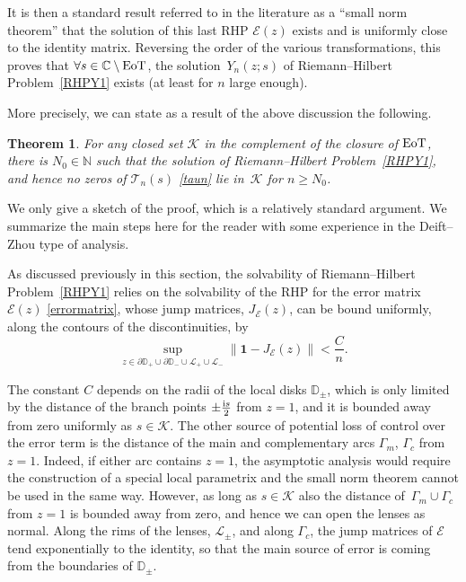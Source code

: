 \documentclass[10pt,a4paper]{amsart}
\numberwithin{equation}{section}
\newtheorem{Theorem}{Theorem}[section]
\theoremstyle{definition}
\def \scr{\mathscr}
\def \DD{\mathbb D}
\def\le{\left}
\def\ri{\right}
\def\be{\begin{equation}}
\def\ee{\end{equation}}
\def \1{\mathbf 1}
\def\C{{\mathbb C}}
\def\N{{\mathbb N}}
\def\pa{\partial}
\def\la{\label}
\begin{document}
It is then a standard result referred to in the literature as a ``small norm theorem'' \cite{Deiftbook,DKMVZ} that the solution of this last RHP $\scr E(z)$ exists and is uniformly close to the identity matrix.
Reversing the order of the various transformations, this proves that $\forall s\in \C \setminus {\rm EoT}$, the solution~$Y_n(z;s)$ of Riemann--Hilbert Problem~\ref{RHPY1} exists (at least for $n$ large enough).

More precisely, we can state as a result of the above discussion the following.


\begin{Theorem}\la{theoremnozeros}
For any closed set $\mathcal K$ in the complement of the closure of ${\rm EoT}$, there is $N_0\in \N$ such that the solution of Riemann--Hilbert Problem~{\rm\ref{RHPY1}}, and hence no zeros of $\mathcal T_n(s)$ \eqref{taun} lie in~$\mathcal K$ for $n\geq N_0$.
\end{Theorem}

We only give a sketch of the proof, which is a relatively standard argument. We summarize the main steps here for the reader with some experience in the Deift--Zhou type of analysis.

 As discussed previously in this section, the solvability of Riemann--Hilbert Problem~\ref{RHPY1} relies on the solvability of the RHP for the error matrix $\scr E(z)$ \eqref{errormatrix}, whose jump matrices, $J_{\scr E}(z)$, can be bound uniformly, along the contours of the discontinuities, by
\be
\sup_{z\in \pa\DD_+\cup \pa \DD_- \cup \scr L_+\cup \scr L_-}
\le\|\1 - J_{\scr E}(z)\ri\| < \frac C n.
\label{estim}
\ee

The constant $C$ depends on the radii of the local disks $\DD_\pm$, which is only limited by the distance of the branch points $\pm \frac {{\rm i} s}2$ from $z=1$, and it is bounded away from zero uniformly as $s\in \mathcal K$. The other source of potential loss of control over the error term is the distance of the main and complementary arcs $\Gamma_m$, $\Gamma_c$ from $z=1$. Indeed, if either arc contains $z=1$, the asymptotic analysis would require the construction of a special local parametrix and the small norm theorem cannot be used in the same way. However, as long as $s\in \mathcal K$ also the distance of~${\Gamma_m\cup \Gamma_c}$ from $z=1$ is bounded away from zero, and hence we can open the lenses as normal. Along the rims of the lenses, $ \scr L_\pm$, and along $\Gamma_c$, the jump matrices of $\scr E$ tend exponentially to the identity, so that the main source of error is coming from the boundaries of $\DD_\pm$.
\end{document}

